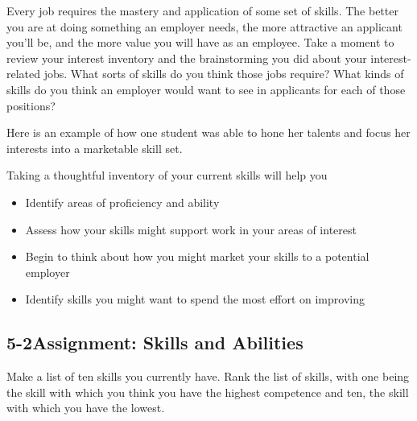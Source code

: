 Every job requires the mastery and application of some set of skills. The better you are at doing something an employer needs, the more attractive an applicant you'll be, and the more value you will have as an employee. Take a moment to review your interest inventory and the brainstorming you did about your interest-related jobs. What sorts of skills do you think those jobs require? What kinds of skills do you think an employer would want to see in applicants for each of those positions?

Here is an example of how one student was able to hone her talents and focus her interests into a marketable skill set.

Taking a thoughtful inventory of your current skills will help you
\begin{itemize}[leftmargin=*]
\item Identify areas of proficiency and ability
\item Assess how your skills might support work in your areas of interest
\item Begin to think about how you might market your skills to a potential employer
\item Identify skills you might want to spend the most effort on improving
\end{itemize}

\pagebreak \subsection*{5-2\quad Assignment: Skills and Abilities}
Make a list of ten skills you currently have. Rank the list of skills, with one being the skill with which you think you have the highest competence and ten, the skill with which you have the lowest.

